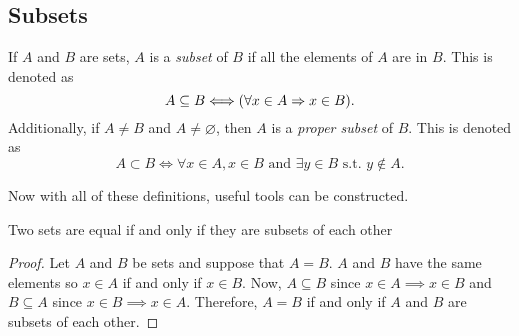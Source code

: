 \documentclass[../notes.tex]{subfiles}
\begin{document}
\subsection{Subsets}
\begin{definition}[Subset]
	\label{def:subset}
	If $A$ and $B$ are sets, $A$ is a \textit{subset} of $B$ if all the elements of $A$ are in $B$. This is denoted as
	\[
	  A \subseteq B \Longleftrightarrow \qty(\forall x \in A \Rightarrow x \in B)
	.\]
	Additionally, if $A \neq B$ and $A \neq \varnothing$, then $A$ is a \textit{proper subset} of $B$. This is denoted as
	\[
		A \subset B \Longleftrightarrow \forall x \in A, x \in B \text{ and } \exists y \in B \text{ s.t. } y \notin A
	.\]
\end{definition}

Now with all of these definitions, useful tools can be constructed.

\begin{theorem}
	Two sets are equal if and only if they are subsets of each other
\end{theorem}
\begin{proof}
	Let $A$ and $B$ be sets and suppose that $A = B$. $A$ and $B$ have the same elements so $x \in A$ if and only if $x \in B$. Now, $A \subseteq B$ since $x \in A \implies x \in B$ and $B \subseteq A$ since $x \in B \implies x \in A$. Therefore, $A = B$ if and only if $A$ and $B$ are subsets of each other.
\end{proof}

\end{document}
